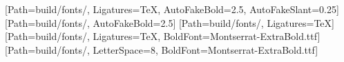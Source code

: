 
\usepackage[a4paper, top=20mm, bottom=20mm, left=20mm, right=20mm]{geometry}
\usepackage{fancyhdr}
\pagestyle{fancy}
\fancyhf{}
\renewcommand{\headrulewidth}{0pt}
\renewcommand{\footrulewidth}{0pt}
\fancyfoot[R]{\footnotesize\color{faint}\dispfont\thepage}

\usepackage[table]{xcolor}
\usepackage[normalem]{ulem}           %

\usepackage{fontspec}
\usepackage{xeCJK}
\providecommand{\eslfontdir}{build/fonts/}
\setmainfont{NotoSans-Regular.ttf}[Path=\eslfontdir, Ligatures=TeX, AutoFakeBold=2.5, AutoFakeSlant=0.25]
[Path=\eslfontdir, AutoFakeBold=2.5]
\newfontfamily{}[Path=\eslfontdir, Ligatures=TeX]
\newfontfamily{}[Path=\eslfontdir, Ligatures=TeX, BoldFont=Montserrat-ExtraBold.ttf]
\newfontfamily{}[Path=\eslfontdir, LetterSpace=8, BoldFont=Montserrat-ExtraBold.ttf]

\newcommand{\eslsym}[1]{{\dispfont #1}}

